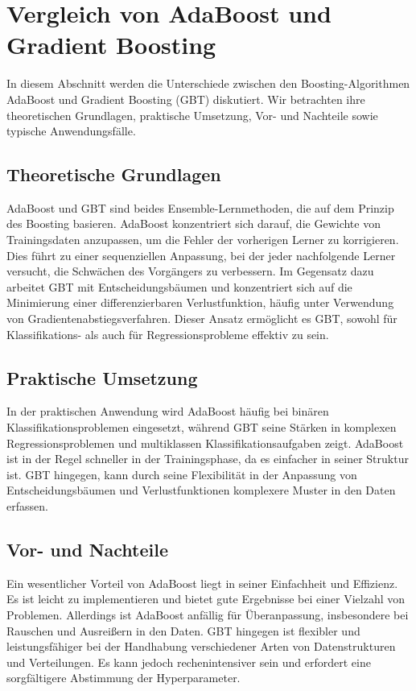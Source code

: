\section{Vergleich von AdaBoost und Gradient Boosting}
In diesem Abschnitt werden die Unterschiede zwischen den Boosting-Algorithmen AdaBoost und Gradient Boosting (GBT) diskutiert. Wir betrachten ihre theoretischen Grundlagen, praktische Umsetzung, Vor- und Nachteile sowie typische Anwendungsfälle.

\subsection{Theoretische Grundlagen}
AdaBoost und GBT sind beides Ensemble-Lernmethoden, die auf dem Prinzip des Boosting basieren. AdaBoost konzentriert sich darauf, die Gewichte von Trainingsdaten anzupassen, um die Fehler der vorherigen Lerner zu korrigieren. Dies führt zu einer sequenziellen Anpassung, bei der jeder nachfolgende Lerner versucht, die Schwächen des Vorgängers zu verbessern. 
\newline
\newline
Im Gegensatz dazu arbeitet GBT mit Entscheidungsbäumen und konzentriert sich auf die Minimierung einer differenzierbaren Verlustfunktion, häufig unter Verwendung von Gradientenabstiegsverfahren. Dieser Ansatz ermöglicht es GBT, sowohl für Klassifikations- als auch für Regressionsprobleme effektiv zu sein.

\subsection{Praktische Umsetzung}
In der praktischen Anwendung wird AdaBoost häufig bei binären Klassifikationsproblemen eingesetzt, während GBT seine Stärken in komplexen Regressionsproblemen und multiklassen Klassifikationsaufgaben zeigt. AdaBoost ist in der Regel schneller in der Trainingsphase, da es einfacher in seiner Struktur ist. GBT hingegen, kann durch seine Flexibilität in der Anpassung von Entscheidungsbäumen und Verlustfunktionen komplexere Muster in den Daten erfassen.

\subsection{Vor- und Nachteile}
Ein wesentlicher Vorteil von AdaBoost liegt in seiner Einfachheit und Effizienz. Es ist leicht zu implementieren und bietet gute Ergebnisse bei einer Vielzahl von Problemen. Allerdings ist AdaBoost anfällig für Überanpassung, insbesondere bei Rauschen und Ausreißern in den Daten.
\newline
\newline
GBT hingegen ist flexibler und leistungsfähiger bei der Handhabung verschiedener Arten von Datenstrukturen und Verteilungen. Es kann jedoch rechenintensiver sein und erfordert eine sorgfältigere Abstimmung der Hyperparameter.

